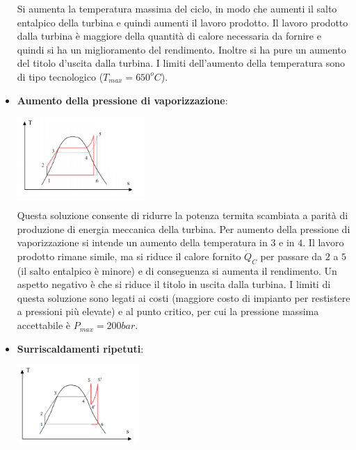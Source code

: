 \begin{itemize}
\begin{center}
    \end{center}
    Si aumenta la temperatura massima del ciclo, in modo che aumenti il salto entalpico della turbina e quindi aumenti il lavoro prodotto. Il lavoro prodotto dalla turbina è maggiore della quantità di calore necessaria da fornire e quindi si ha un miglioramento del rendimento.\newline
    \newline
    Inoltre si ha pure un aumento del titolo d'uscita dalla turbina. \newline
    \newline
    I limiti dell'aumento della temperatura sono di tipo tecnologico ($T_{max} = 650^o C$).
    \item \textbf{ Aumento della pressione di vaporizzazione}:
    \begin{center}
        \includegraphics[height=3cm]{../L08/img11.PNG}
    \end{center}
    Questa soluzione consente di ridurre la potenza termita scambiata a parità di produzione di energia meccanica della turbina.\newline
    \newline
    Per aumento della pressione di vaporizzazione si intende un aumento della temperatura in $3$ e in $4$.\newline
    \newline
    Il lavoro prodotto rimane simile, ma si riduce il calore fornito $\dot{Q}_C$ per passare da $2$ a $5$ (il salto entalpico è minore) e di conseguenza si aumenta il rendimento.\newline
    \newline
    Un aspetto negativo è che si riduce il titolo in uscita dalla turbina.\newline
    \newline
    I limiti di questa soluzione sono legati ai costi (maggiore costo di impianto per restistere a pressioni più elevate) e al punto critico, per cui la pressione massima accettabile è $P_{max} = 200 bar$.
    \item \textbf{Surriscaldamenti ripetuti}:
    \begin{center}
        \includegraphics[height=3cm]{../L08/img12.PNG}

\end{center}
\end{itemize}
